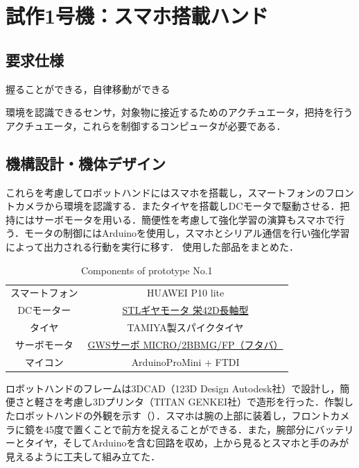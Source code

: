 \chapter{試作1号機：スマホ搭載ハンド}
\newpage

\section{要求仕様}
握ることができる，自律移動ができる

環境を認識できるセンサ，対象物に接近するためのアクチュエータ，把持を行うアクチュエータ，これらを制御するコンピュータが必要である．


\section{機構設計・機体デザイン}

これらを考慮してロボットハンドにはスマホを搭載し，スマートフォンのフロントカメラから環境を認識する．またタイヤを搭載しDCモータで駆動させる．把持にはサーボモータを用いる．簡便性を考慮して強化学習の演算もスマホで行う．モータの制御にはArduinoを使用し，スマホとシリアル通信を行い強化学習によって出力される行動を実行に移す．
使用した部品をまとめた．

\begin{table}
    \centering
    \caption{Components of prototype No.1}
    \begin{tabular}{cc}\toprule
        スマートフォン & HUAWEI P10 lite \\
        DCモーター & \href{http://akizukidenshi.com/catalog/g/gM-12379/}{STLギヤモータ 栄42D長軸型} \\
        タイヤ & TAMIYA製スパイクタイヤ \\ 
        サーボモータ & \href{http://akizukidenshi.com/catalog/g/gM-01908/}{GWSサーボ MICRO/2BBMG/FP（フタバ）} \\ 
        マイコン & ArduinoProMini + FTDI \\ \bottomrule
    \end{tabular} 
    \label{tab:1号機部品}
\end{table}

ロボットハンドのフレームは3DCAD（123D Design Autodesk社）で設計し，簡便さと軽さを考慮し3Dプリンタ（TITAN GENKEI社）で造形を行った．作製したロボットハンドの外観を示す（）．スマホは腕の上部に装着し，フロントカメラに鏡を45度で置くことで前方を捉えることができる．また，腕部分にバッテリーとタイヤ，そしてArduinoを含む回路を収め，上から見るとスマホと手のみが見えるように工夫して組み立てた．

